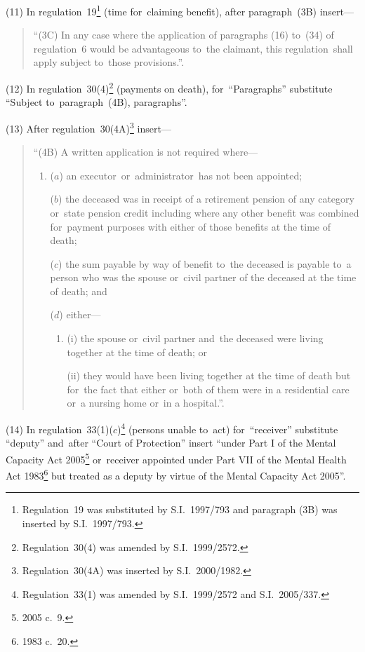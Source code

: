 \documentclass[12pt,a4paper]{article}
\begin{document}
(11) In regulation~19\footnote{Regulation~19 was substituted by S.I.~1997/793 and paragraph (3B) was inserted by S.I.~1997/793.} (time for~claiming benefit), after paragraph~(3B) insert—
\begin{quotation}
“(3C) In any case where the application of paragraphs (16) to~(34) of regulation~6 would be advantageous to~the claimant, this regulation~shall apply subject to~those provisions.”.
\end{quotation}

(12) In regulation~30(4)\footnote{Regulation~30(4) was amended by S.I.~1999/2572.} (payments on death), for~“Paragraphs” substitute “Subject to~paragraph~(4B), paragraphs”.

(13) After regulation~30(4A)\footnote{Regulation~30(4A) was inserted by S.I.~2000/1982.} insert—
\begin{quotation}
“(4B) A written application is not required where—
\begin{enumerate}\item[]
($a$) an executor~or~administrator~has not been appointed;

($b$) the deceased was in receipt of a retirement pension of any category or~state pension credit including where any other benefit was combined for~payment purposes with either of those benefits at the time of death;

($c$) the sum payable by way of benefit to~the deceased is payable to~a person who was the spouse or~civil partner of the deceased at the time of death; and

($d$) either—
\begin{enumerate}\item[]
(i) the spouse or~civil partner and~the deceased were living together at the time of death; or

(ii) they would have been living together at the time of death but for~the fact that either or~both of them were in a residential care or~a nursing home or~in a hospital.”.
\end{enumerate}
\end{enumerate}
\end{quotation}

(14) In regulation~33(1)($c$)\footnote{Regulation~33(1) was amended by S.I.~1999/2572 and S.I.~2005/337.} (persons unable to~act) for~“receiver” substitute “deputy” and~after “Court of Protection” insert “under Part I of the Mental Capacity Act 2005\footnote{2005 c.~9.} or~receiver appointed under Part VII of the Mental Health Act 1983\footnote{1983 c.~20.} but treated as a deputy by virtue of the Mental Capacity Act 2005”.
\end{document}
